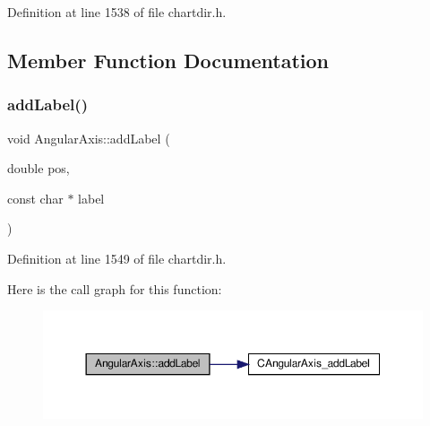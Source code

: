 Definition at line 1538 of file chartdir.\+h.



\subsection{Member Function Documentation}
\mbox{\label{class_angular_axis_a6f255a756fc6e9e19096618f9e34873f}} 
\subsubsection{\texorpdfstring{add\+Label()}{addLabel()}}
{\footnotesize\ttfamily void Angular\+Axis\+::add\+Label (\begin{DoxyParamCaption}\item[{double}]{pos,  }\item[{const char $\ast$}]{label }\end{DoxyParamCaption})\hspace{0.3cm}{\ttfamily [inline]}}



Definition at line 1549 of file chartdir.\+h.

Here is the call graph for this function\+:
\nopagebreak
\begin{figure}[H]
\begin{center}
\leavevmode
\includegraphics[width=350pt]{class_angular_axis_a6f255a756fc6e9e19096618f9e34873f_cgraph}
\end{center}
\end{figure}
\mbox{\label{class_angular_axis_a0e99a07d920a902b3fa57e8a3c272004}} 
